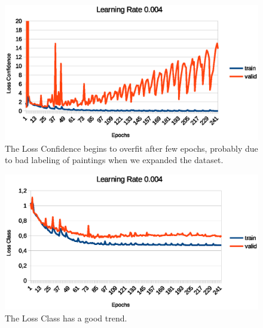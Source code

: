 \documentclass[10pt,twocolumn,letterpaper]{article}
\begin{document}
\begin{figure}[t]
\begin{center}
   \includegraphics[width=1\linewidth]{loss_conf.eps}
\end{center}
   \caption{The Loss Confidence begins to overfit after few epochs, probably due to bad labeling of
paintings when we expanded the dataset.}
\label{fig:long}
\label{fig:onecol}
\end{figure}

\begin{figure}[t]
\begin{center}
   \includegraphics[width=1\linewidth]{loss_class.eps}
\end{center}
   \caption{The Loss Class has a good trend.}
\label{fig:long}
\label{fig:onecol}
\end{figure}
\end{document}
